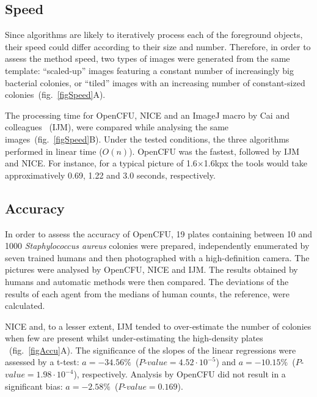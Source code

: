 \documentclass[10pt]{article}
\newcommand{\n}{seven}
\newcommand{\sa}{\emph{Staphylococcus aureus}}
\newcommand{\IJM}{IJM}
\begin{document}
\subsection*{Speed}
Since algorithms are likely to iteratively process each of the foreground
objects, their speed could differ according to their size and number.
Therefore, in order to assess the method speed,  two types of images were
generated from the same template:
``scaled-up'' images featuring a constant number of increasingly big bacterial
colonies, or ``tiled'' images with an increasing number of constant-sized
colonies~(fig.~\ref{figSpeed}A).

The processing time for OpenCFU, NICE\cite{clarke_lowcost_2010} and an ImageJ macro by Cai and colleagues
\cite{cai_optimized_2011}~(\IJM{}),
were compared while analysing the same images~(fig.~\ref{figSpeed}B). Under the
tested conditions, the three algorithms performed in linear time ($O(n)$).
OpenCFU was the fastest, followed by \IJM{} and NICE.
For instance, for a typical picture of 1.6$\times{}$1.6kpx the tools would take
approximatively 0.69, 1.22 and 3.0 seconds, respectively.

\subsection*{Accuracy} 
In order to assess the accuracy of OpenCFU, 19 plates
containing between 10 and 1000 \sa{} colonies were prepared, independently
enumerated by \n{} trained humans and then photographed with a high-definition camera.
The pictures were analysed by OpenCFU, NICE and \IJM{}.
The results obtained by humans and automatic methods were then compared.
The deviations of the results of each
agent from the medians of human counts, the reference, were
calculated.

NICE and, to a lesser extent, \IJM{} tended to over-estimate the number of
colonies when few are present
whilst under-estimating the high-density
plates 
~(fig.~\ref{figAccu}A). The significance of the slopes of the linear
regressions were assessed by a t-test:
$a = -34.56\%$~($P$-$value = 4.52 \cdot 10^{-5}$) and $a = -10.15\%$~($P$-$value =
1.98  \cdot 10^{-4}$), respectively. Analysis by OpenCFU did not result
in a significant bias: $a = -2.58\%$~($P$-$value = 0.169$).
\end{document}
